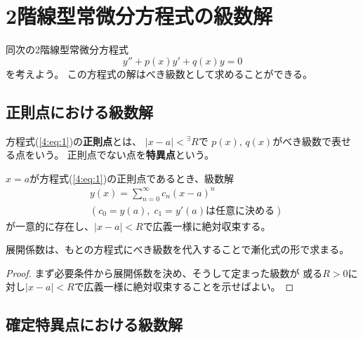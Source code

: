 \documentclass[report]{jlreq}
\begin{document}
\chapter{2階線型常微分方程式の級数解}

同次の2階線型常微分方程式
\begin{equation}
    y'' + p(x) y' + q(x) y = 0
    \label{4:eq:1}
\end{equation}
を考えよう。
この方程式の解はべき級数として求めることができる。

\section{正則点における級数解}

\begin{definition}[4.1.1 正則点]
    方程式(\ref{4:eq:1})の\textbf{正則点}とは、
    $|x - a| < {}^\exists R$で
    $p(x),\, q(x)$がべき級数で表せる点をいう。
    正則点でない点を\textbf{特異点}という。
\end{definition}

\begin{theorem}[4.1.2 正則点での級数解の存在]
    $x = a$が方程式(\ref{4:eq:1})の正則点であるとき、級数解
    \begin{equation}
        \begin{split}
            &y(x) = \sum_{n = 0}^\infty c_n (x - a)^n \\
            &(\text{$c_0 = y(a),\; c_1 = y'(a)$は任意に決める})
        \end{split}
    \end{equation}
    が一意的に存在し、$|x - a| < R$で広義一様に絶対収束する。
\end{theorem}

展開係数は、もとの方程式にべき級数を代入することで漸化式の形で求まる。

\begin{proof}
    まず必要条件から展開係数を決め、そうして定まった級数が
    或る$R > 0$に対し$|x - a| < R$で広義一様に絶対収束することを示せばよい。
\end{proof}

\section{確定特異点における級数解}
\end{document}
